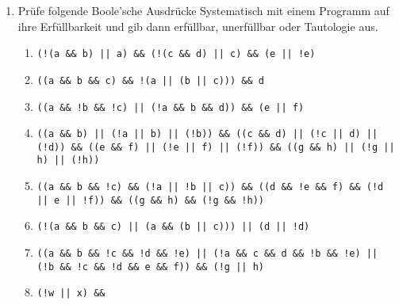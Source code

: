 \documentclass{../../sheet}
\begin{document}
\begin{enumerate}
    \item Prüfe folgende Boole'sche Ausdrücke Systematisch mit einem Programm auf ihre Erfüllbarkeit und gib dann erfüllbar, unerfüllbar oder Tautologie aus.
          \begin{enumerate}
              \item \begin{ausgabe} \texttt{(!(a \&\& b) || a) \&\& (!(c \&\& d) || c) \&\& (e || !e)} \end{ausgabe} %
              \item \begin{ausgabe} \texttt{((a \&\& b \&\& c) \&\& !(a || (b || c))) \&\& d} \end{ausgabe} %
              \item \begin{ausgabe} \texttt{((a \&\& !b \&\& !c) || (!a \&\& b \&\& d)) \&\& (e || f)} \end{ausgabe} %
              \item \begin{ausgabe} \texttt{((a \&\& b) || (!a || b) || (!b)) \&\&
                            ((c \&\& d) || (!c || d) || (!d)) \&\&
                            ((e \&\& f) || (!e || f) || (!f)) \&\&
                            ((g \&\& h) || (!g || h) || (!h))}
                    \end{ausgabe} %
              \item \begin{ausgabe} \texttt{((a \&\& b \&\& !c) \&\& (!a || !b || c)) \&\&
                            ((d \&\& !e \&\& f) \&\& (!d || e || !f)) \&\&
                            ((g \&\& h) \&\& (!g \&\& !h))}
                    \end{ausgabe} %
              \item \begin{ausgabe} \texttt{(!(a \&\& b \&\& c) || (a \&\& (b || c))) || (d || !d)} \end{ausgabe} %
              \item \begin{ausgabe} \texttt{((a \&\& b \&\& !c \&\& !d \&\& !e) ||
                            (!a \&\& c \&\& d \&\& !b \&\& !e) ||
                            (!b \&\& !c \&\& !d \&\& e \&\& f)) \&\& (!g || h)}
                    \end{ausgabe} %
              \item \begin{ausgabe} \texttt{(!w || x) \&\&
}
\end{ausgabe}
\end{enumerate}
\end{enumerate}
\end{document}
